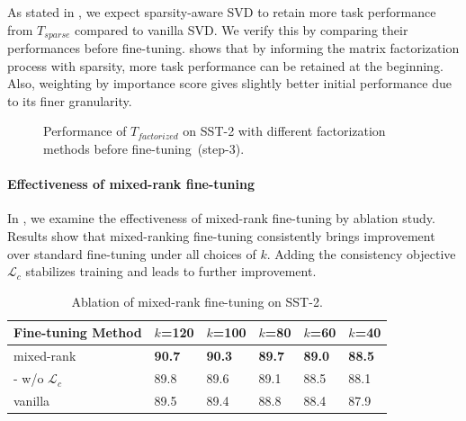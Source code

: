 As stated in , we expect sparsity-aware SVD to retain more task performance from $T_{sparse}$ compared to vanilla SVD. We verify this by comparing their performances before fine-tuning. 
 shows that by informing the matrix factorization process with sparsity, 
more task performance can be retained at the beginning. 
Also, weighting by importance score gives slightly better initial performance due to 
its finer granularity.
\begin{figure}[h]
	\centering
	\caption{Performance of $T_{factorized}$ on SST-2 with different factorization methods before fine-tuning~(step-3).}
	\label{fig:init}
\end{figure}

\paragraph{Effectiveness of mixed-rank fine-tuning} In , we examine the effectiveness of mixed-rank fine-tuning by ablation study.  Results show that mixed-ranking fine-tuning consistently brings improvement over standard fine-tuning under all choices of $k$. Adding the consistency objective $\mathcal{L}_{c}$  stabilizes training and leads to further improvement. 
\begin{table}[th]
	\centering
	\scriptsize
	\begin{tabular}{|l|lllll|}
\hline
		Fine-tuning Method & $k$=120 & $k$=100 & $k$=80 &$k$=60 & $k$=40 \\
		\hline
		mixed-rank      & \textbf{90.7}  & \textbf{90.3}  & \textbf{89.7} &\textbf{89.0}  & \textbf{88.5} \\
		- w/o $\mathcal{L}_{c}$    &89.8 &89.6   &89.1  &88.5 &88.1  \\
\hline
		vanilla  & 89.5  & 89.4  &88.8  &88.4 & 87.9	 \\
\hline
	\end{tabular}
	\caption{Ablation of mixed-rank fine-tuning on SST-2.}
	\label{table:wwomixedrank}
\end{table}

